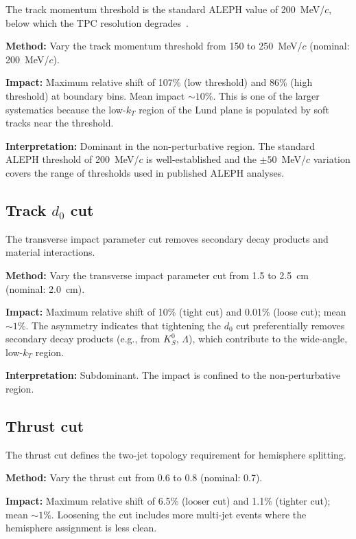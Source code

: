 \documentclass[11pt,a4paper]{article}
\begin{document}
The track momentum threshold is the standard ALEPH value of
200~MeV/$c$, below which the TPC resolution degrades~\cite{ALEPH:1998hhr}.

\textbf{Method:} Vary the track momentum threshold from 150 to
250~MeV/$c$ (nominal: 200~MeV/$c$).

\textbf{Impact:} Maximum relative shift of 107\% (low threshold) and
86\% (high threshold) at boundary bins.  Mean impact $\sim\!10\%$.
This is one of the larger systematics because the low-$k_T$ region
of the Lund plane is populated by soft tracks near the threshold.

\textbf{Interpretation:} Dominant in the non-perturbative region.
The standard ALEPH threshold of 200~MeV/$c$ is well-established and
the $\pm 50$~MeV/$c$ variation covers the range of thresholds used
in published ALEPH analyses.

\subsection{Track $d_0$ cut}
\label{sec:syst-d0}

The transverse impact parameter cut removes secondary decay products
and material interactions.

\textbf{Method:} Vary the transverse impact parameter cut from 1.5 to
2.5~cm (nominal: 2.0~cm).

\textbf{Impact:} Maximum relative shift of 10\% (tight cut) and
0.01\% (loose cut); mean $\sim\!1\%$.  The asymmetry indicates
that tightening the $d_0$ cut preferentially removes secondary
decay products (e.g., from $K^0_S$, $\Lambda$), which contribute
to the wide-angle, low-$k_T$ region.

\textbf{Interpretation:} Subdominant.  The impact is confined to
the non-perturbative region.

\subsection{Thrust cut}
\label{sec:syst-thrust}

The thrust cut defines the two-jet topology requirement for
hemisphere splitting.

\textbf{Method:} Vary the thrust cut from 0.6 to 0.8 (nominal: 0.7).

\textbf{Impact:} Maximum relative shift of 6.5\% (looser cut) and
1.1\% (tighter cut); mean $\sim\!1\%$.  Loosening the cut includes
more multi-jet events where the hemisphere assignment is less clean.
\end{document}
